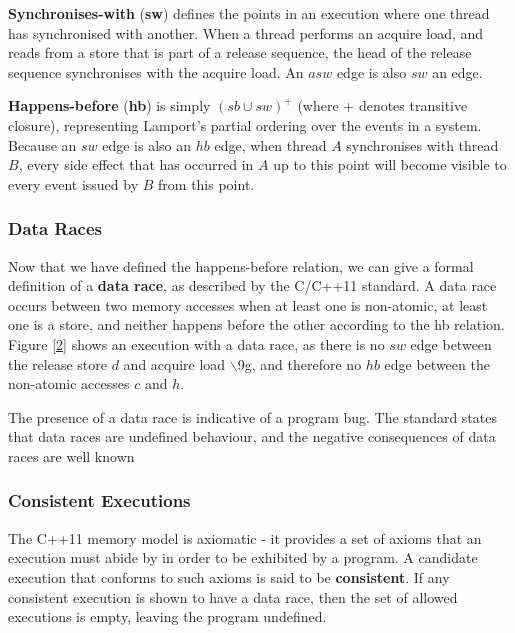 \documentclass[11pt]{article}
\begin{document}
\textbf{Synchronises-with} (\textbf{sw}) defines the points in an execution where one thread has synchronised with
another. When a thread performs an acquire load, and reads from a store that is part of a release
sequence, the head of the release sequence synchronises with the acquire load. An \(asw\) edge is also
\(sw\) an edge.

\textbf{Happens-before} (\textbf{hb}) is simply \((sb\cup sw)^+\) (where + denotes transitive closure), representing
Lamport’s partial ordering over the events in a system. Because an \(sw\) edge is also an \(hb\) edge,
when thread \(A\) synchronises with thread \(B\), every side effect that has occurred in \(A\) up to
this point will become visible to every event issued by \(B\) from this point.
\subsubsection{Data Races}
\label{sec:org08eb2f0}
Now that we have defined the happens-before relation, we can give a formal definition of a \textbf{data race},
as described by the C/C++11 standard. A data race occurs between two memory accesses when at least one
is non-atomic, at least one is a store, and neither happens before the other according to the hb
relation. Figure \ref{2} shows an execution with a data race, as there is no \(sw\) edge between the
release store \(d\) and acquire load $\backslash$9g, and therefore no \(hb\) edge between the non-atomic accesses
\(c\) and \(h\).

The presence of a data race is indicative of a program bug. The standard states that data races are
undefined behaviour, and the negative consequences of data races are well known
\subsubsection{Consistent Executions}
\label{sec:org731a152}
The C++11 memory model is axiomatic - it provides a set of axioms that an execution must abide by in
order to be exhibited by a program. A candidate execution that conforms to such axioms is said to be
\textbf{consistent}.
If any consistent execution is shown to have a data race, then the set of allowed executions is empty,
leaving the program undefined.
\end{document}
